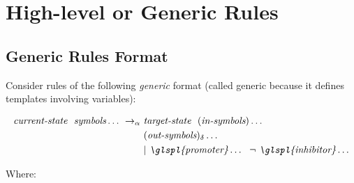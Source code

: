\section{High-level or Generic Rules}

\subsection{\label{sec:cps:genericrules}Generic Rules Format}
Consider rules of the following \emph{generic} format 
(called generic because it defines templates involving variables):
\begin{framed}
\vspace{-0.6cm}
\begin{align*}
\textit{current-state} ~~ \textit{symbols} \dots ~ \rightarrow_\alpha ~ & \textit{target-state} ~~ (\textit{in-symbols}) \dots ~~ \\
 & (\textit{out-symbols})_\delta \dots \\
 & | ~  \textit{\glspl{promoter}} \dots ~~ \neg ~  \textit{\glspl{inhibitor}} \dots
\end{align*}
\vspace{-0.8cm}
\end{framed}
Where:

